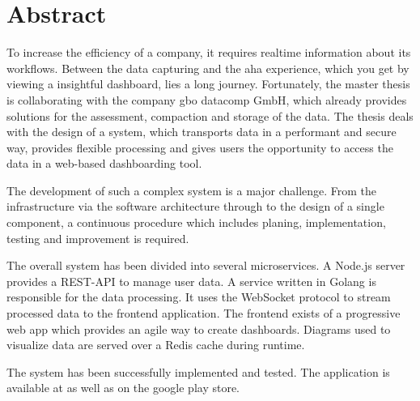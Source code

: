 \chapter*{Abstract}
\label{chap:abstract}

To increase the efficiency of a company, it requires realtime
information about its workflows. Between the data capturing
and the aha experience, which you get by viewing a 
insightful dashboard, lies a long journey. Fortunately,
the master thesis is collaborating with the company gbo datacomp GmbH,
which already provides solutions for the assessment, compaction and
storage of the data. The thesis deals with the design of a system,
which transports data in a performant and secure way, provides
flexible processing and gives users the opportunity to access
the data in a web-based dashboarding tool.

The development of such a complex system is a major challenge.
From the infrastructure via the software architecture through to
the design of a single component, a continuous procedure which includes
planing, implementation, testing and improvement is required.

The overall system has been divided into several microservices. A Node.js
server provides a REST-API to manage user data. A service written in Golang is
responsible for the data processing. It uses the WebSocket protocol to stream
processed data to the frontend application. The frontend exists of a progressive
web app which provides an agile way to create dashboards. Diagrams used to visualize
data are served over a Redis cache during runtime.

The system has been successfully implemented and tested. The application is available
at  as well as on the google play store.
